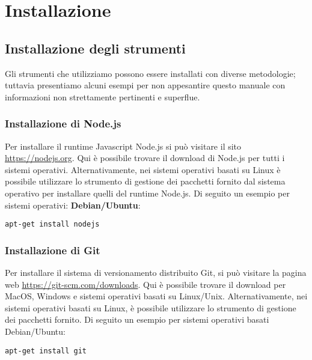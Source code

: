 \section{Installazione}
\subsection{Installazione degli strumenti}
Gli strumenti che utilizziamo possono essere installati con diverse metodologie; tuttavia presentiamo alcuni esempi per non appesantire questo manuale con informazioni non strettamente pertinenti e superflue.
\subsubsection{Installazione di Node.js}
Per installare il runtime Javascript Node.js si può visitare il sito \url{https://nodejs.org}. Qui è possibile trovare il download di Node.js per tutti i sistemi operativi. Alternativamente, nei sistemi operativi basati su Linux è possibile utilizzare lo strumento di gestione dei pacchetti fornito dal sistema operativo per installare quelli del runtime Node.js.
Di seguito un esempio per sistemi operativi: \textbf{Debian/Ubuntu}:
\begin{verbatim}
apt-get install nodejs
\end{verbatim}

\subsubsection{Installazione di Git}
Per installare il sistema di versionamento distribuito Git, si può visitare la pagina web \url{https://git-scm.com/downloads}. Qui è possibile trovare il download per MacOS, Windows e sistemi operativi basati su Linux/Unix. Alternativamente, nei sistemi operativi basati su Linux, è possibile utilizzare lo strumento di gestione dei pacchetti fornito. Di seguito un esempio per sistemi operativi basati Debian/Ubuntu:
\begin{verbatim}
apt-get install git
\end{verbatim}